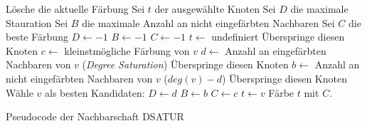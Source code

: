 \begin{algorithm}
\begin{algorithmic}[1]
\State Lösche die aktuelle Färbung
\State Sei $t$ der ausgewählte Knoten
\State Sei $D$ die maximale Stauration
\State Sei $B$ die maximale Anzahl an nicht eingefärbten Nachbaren
\State Sei $C$ die beste Färbung
\State $D \leftarrow -1$
\State $B \leftarrow -1$
\State $C \leftarrow -1$
\State $t \leftarrow $ undefiniert
\State Überspringe diesen Knoten
\Else
\State $c\leftarrow$ kleinstmögliche Färbung von $v$
\State $d\leftarrow$ Anzahl an eingefärbten Nachbaren von $v$ (\textit{Degree Saturation})
\State Überspringe diesen Knoten
\EndIf
\State $b\leftarrow$ Anzahl an nicht eingefärbten Nachbaren von $v$ ($deg(v) - d$)
\State Überspringe diesen Knoten
\EndIf
\State Wähle $v$ als besten Kandidaten:
\State $D \leftarrow d$
\State $B \leftarrow b$
\State $C \leftarrow c$
\State $t \leftarrow v$
\EndIf
\EndFor
\State Färbe $t$ mit $C$.
\EndFor
\end{algorithmic}
\caption{Pseudocode der Nachbarschaft DSATUR}
\end{algorithm}
